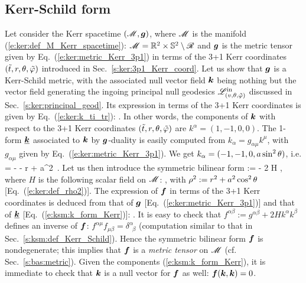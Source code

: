 \subsection{Kerr-Schild form}

Let consider the Kerr spacetime $(\mathscr{M},\bm{g})$, where $\mathscr{M}$ is the manifold
(\ref{e:ker:def_M_Kerr_spacetime}): $\mathscr{M} = \mathbb{R}^2\times\mathbb{S}^2 \setminus \mathscr{R}$
and $\bm{g}$ is the metric tensor given by Eq.~(\ref{e:ker:metric_Kerr_3p1})
in terms of the 3+1 Kerr coordinates $({\tilde t}, r, \theta,{\tilde\varphi})$ introduced in
Sec.~\ref{s:ker:3p1_Kerr_coord}.
Let us show that $\bm{g}$ is a Kerr-Schild metric, with the associated null vector
field $\bm{k}$ being nothing but the vector field generating the
ingoing principal null geodesics $\mathscr{L}^{\rm in}_{(v,\theta,{\tilde\varphi})}$  discussed in Sec.~\ref{s:ker:principal_geod}.
Its expression in terms of the 3+1 Kerr coordinates is given by Eq.~(\ref{e:ker:k_ti_tr}):
\be \label{e:ksm:k_Kerr}
    .
\ee
In other words, the components of $\bm{k}$ with respect to the 3+1 Kerr coordinates $({\tilde t}, r, \theta,{\tilde\varphi})$ are $k^\alpha = (1, -1, 0, 0)$.
The 1-form $\underline{\bm{k}}$ associated to $\bm{k}$ by $\bm{g}$-duality is easily computed
from $k_\alpha = g_{\alpha\mu} k^\mu$, with $g_{\alpha\mu}$ given by
Eq.~(\ref{e:ker:metric_Kerr_3p1}). We get
$k_\alpha = (-1, -1, 0, a\sin^2\theta)$, i.e.
\be \label{e:ksm:k_form_Kerr}
     = - \dd \ti - \dd r + a\sin^2\th \, \dd\tph .
\ee
Let us then introduce the symmetric bilinear form
\be
     :=  - 2 H  \otimes {} ,
\ee
where $H$ is the following scalar field on $\mathscr{M}$:
\be \label{e:ksm:H_Kerr}
   ,
\ee
with $\rho^2 := r^2 + a^2 \cos^2\theta$ [Eq.~(\ref{e:ker:def_rho2})].
The expression of $\bm{f}$ in terms of the 3+1 Kerr coordinates is deduced
from that of $\bm{g}$ [Eq.~(\ref{e:ker:metric_Kerr_3p1})] and that of
$\underline{\bm{k}}$ [Eq.~(\ref{e:ksm:k_form_Kerr})]:
\be \label{e:ksm:f_Kerr}
  .
\ee
It is easy to check that $f^{\alpha\beta} := g^{\alpha\beta} + 2 H k^\alpha k^\beta$
defines an inverse of $\bm{f}$: $f^{\alpha\mu} f_{\mu\beta} = \delta^\alpha_{\ \; \beta}$
(computation similar to that in Sec.~\ref{s:ksm:def_Kerr_Schild}). Hence the
symmetric bilinear form $\bm{f}$ is nondegenerate; this implies that $\bm{f}$
is a \emph{metric tensor} on $\mathscr{M}$ (cf. Sec.~\ref{s:bas:metric}).
Given the components (\ref{e:ksm:k_form_Kerr}), it is immediate to check that $\bm{k}$ is a null vector for $\bm{f}$ as well: $\bm{f}(\bm{k}, \bm{k}) = 0$.
